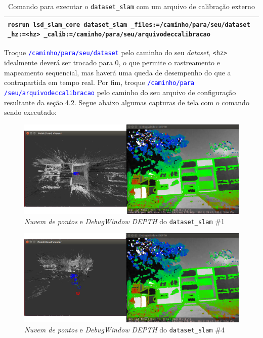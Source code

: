 \begin{table}[H]\label{tb:16}
\begin{tabular}{| p{\textwidth}|}
\hline
\texttt{rosrun lsd\_slam\_core dataset\_slam \_files:=/caminho/para/seu/dataset \_hz:=<hz> \_calib:=/caminho/para/seu/arquivodeccalibracao}\\
\hline
\end{tabular}
\caption{Comando para executar o \texttt{dataset\_slam} com um arquivo de calibração externo}
\end{table}

Troque \textcolor{blue}{\texttt{/caminho/para/seu/dataset}} pelo caminho do seu \textit{dataset}, \texttt{<hz>} idealmente deverá ser trocado para 0, o que permite o rastreamento e mapeamento sequencial, mas haverá uma queda de desempenho do que a contrapartida em tempo real. Por fim, troque \textcolor{blue}{\texttt{/caminho/para}\\ \texttt{/seu/arquivodeccalibracao}} pelo caminho do seu arquivo de configuração resultante da seção 4.2. Segue abaixo algumas capturas de tela com o comando sendo executado:

\begin{figure}[H]
	\centering
		\includegraphics[width= \textwidth]{Imagens/figura3-26E3-27.png}
	\caption{\textit{Nuvem de pontos} e \textit{DebugWindow DEPTH} do \texttt{dataset\_slam} \#1}
	\label{fig3:26}
\end{figure}





\begin{figure}[H]
	\centering
		\includegraphics[width= \textwidth]{Imagens/figura3-28E3-29.png}
	\caption{\textit{Nuvem de pontos} e \textit{DebugWindow DEPTH} do \texttt{dataset\_slam} \#4}
	\label{fig3:27}
\end{figure}

